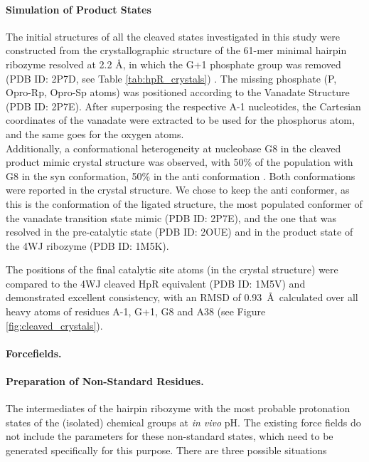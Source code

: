 \documentclass[journal=jacsat,manuscript=article]{achemso}
\begin{document}
\paragraph{Simulation of Product States}
The initial structures of all the cleaved states investigated in this study were constructed
from the crystallographic structure of the 61-mer minimal hairpin ribozyme resolved at 2.2 \AA,
in which the G+1 phosphate group was removed (PDB ID: 2P7D, see Table \ref{tab:hpR_crystals}) \cite{torelli_comparison_2007}.
The missing phosphate (P, Opro-Rp, Opro-Sp atoms) was positioned according to the Vanadate Structure (PDB ID: 2P7E).
After superposing the respective A-1 nucleotides, 
the Cartesian coordinates of the vanadate were extracted to be used for the phosphorus atom, and the same goes for the oxygen atoms.\\
Additionally, a conformational heterogeneity at nucleobase G8 in the cleaved product mimic crystal structure was observed, 
with 50\% of the population with G8 in the syn conformation, 50\% in the anti conformation \cite{torelli_comparison_2007}.
Both conformations were reported in the crystal structure. 
We chose to keep the anti conformer, as this is the conformation of the ligated structure, 
the most populated conformer of the vanadate transition state mimic (PDB ID: 2P7E), 
and the one that was resolved in the pre-catalytic state (PDB ID: 2OUE) and in the product state of the 4WJ ribozyme (PDB ID: 1M5K).

The positions of the final catalytic site atoms (in the crystal structure) were compared to the 4WJ cleaved HpR equivalent (PDB ID: 1M5V)
and demonstrated excellent consistency, with an RMSD of 0.93~\AA\ calculated over all heavy atoms of residues A-1, G+1, G8 and A38 (see Figure \ref{fig:cleaved_crystals}).


\paragraph{Forcefields.}

\paragraph{Preparation of Non-Standard Residues.}

The intermediates of the hairpin ribozyme with the most probable protonation states of the (isolated)
chemical groups at \textit{in vivo} pH.
The existing force fields do not include the parameters for these non-standard states, 
which need to be generated specifically for this purpose.
There are three possible situations
\end{document}
